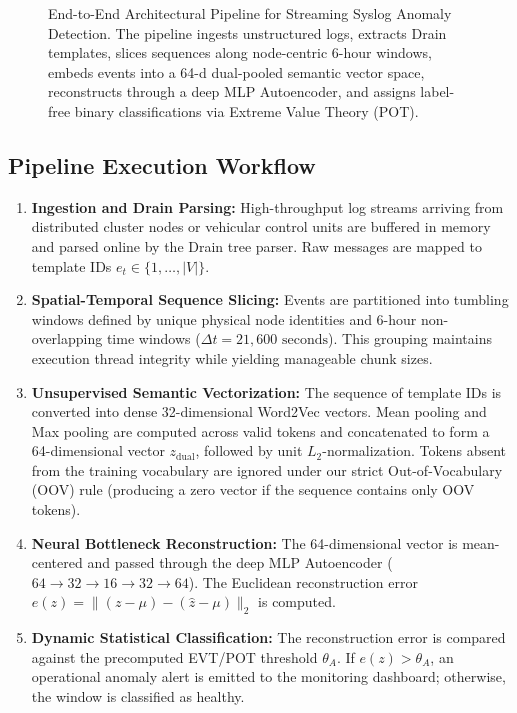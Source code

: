 \begin{figure}[htbp]
    \centering
    
    \caption{End-to-End Architectural Pipeline for Streaming Syslog Anomaly Detection. The pipeline ingests unstructured logs, extracts Drain templates, slices sequences along node-centric 6-hour windows, embeds events into a 64-d dual-pooled semantic vector space, reconstructs through a deep MLP Autoencoder, and assigns label-free binary classifications via Extreme Value Theory (POT).}
    \label{fig:pipeline_architecture}
\end{figure}

\subsection{Pipeline Execution Workflow}
\begin{enumerate}
    \item \textbf{Ingestion and Drain Parsing:} High-throughput log streams arriving from distributed cluster nodes or vehicular control units are buffered in memory and parsed online by the Drain tree parser. Raw messages are mapped to template IDs $e_t \in \{1, \dots, |V|\}$.
    \item \textbf{Spatial-Temporal Sequence Slicing:} Events are partitioned into tumbling windows defined by unique physical node identities and 6-hour non-overlapping time windows ($\Delta t = 21,600\text{ seconds}$). This grouping maintains execution thread integrity while yielding manageable chunk sizes.
    \item \textbf{Unsupervised Semantic Vectorization:} The sequence of template IDs is converted into dense 32-dimensional Word2Vec vectors. Mean pooling and Max pooling are computed across valid tokens and concatenated to form a 64-dimensional vector $z_{\text{dual}}$, followed by unit $L_2$-normalization. Tokens absent from the training vocabulary are ignored under our strict Out-of-Vocabulary (OOV) rule (producing a zero vector if the sequence contains only OOV tokens).
    \item \textbf{Neural Bottleneck Reconstruction:} The 64-dimensional vector is mean-centered and passed through the deep MLP Autoencoder ($64 \rightarrow 32 \rightarrow 16 \rightarrow 32 \rightarrow 64$). The Euclidean reconstruction error $e(z) = \|(z - \mu) - (\hat{z} - \mu)\|_2$ is computed.
    \item \textbf{Dynamic Statistical Classification:} The reconstruction error is compared against the precomputed EVT/POT threshold $\theta_A$. If $e(z) > \theta_A$, an operational anomaly alert is emitted to the monitoring dashboard; otherwise, the window is classified as healthy.
\end{enumerate}

